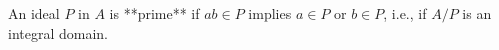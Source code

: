 An ideal $P$ in $A$ is **prime** if $ab \in P$ implies $a \in P$ or $b \in P$, i.e., if $A/P$ is an integral domain.
